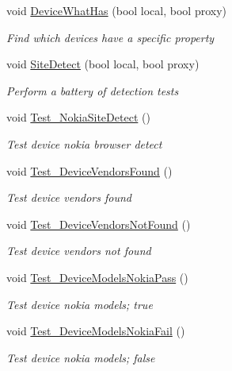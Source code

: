 \begin{DoxyCompactItemize}
void \hyperlink{class_h_d3_test_1_1_h_d3_test_af3129564580d98ec21d1ade13576ee43}{Device\+What\+Has} (bool local, bool proxy)
\begin{DoxyCompactList}\small\item\em Find which devices have a specific property \end{DoxyCompactList}\item 
void \hyperlink{class_h_d3_test_1_1_h_d3_test_a33f6daedc5c64964b38fef634f304c78}{Site\+Detect} (bool local, bool proxy)
\begin{DoxyCompactList}\small\item\em Perform a battery of detection tests \end{DoxyCompactList}\item 
void \hyperlink{class_h_d3_test_1_1_h_d3_test_aff6b193e3348e93dfe03d5369ab58d73}{Test\+\_\+\+Nokia\+Site\+Detect} ()
\begin{DoxyCompactList}\small\item\em Test device nokia browser detect \end{DoxyCompactList}\item 
void \hyperlink{class_h_d3_test_1_1_h_d3_test_a104ffe57dc36baf2057bcfb239f5f4ef}{Test\+\_\+\+Device\+Vendors\+Found} ()
\begin{DoxyCompactList}\small\item\em Test device vendors found \end{DoxyCompactList}\item 
void \hyperlink{class_h_d3_test_1_1_h_d3_test_a7577b13f23cae187e68d9d9a62692a6e}{Test\+\_\+\+Device\+Vendors\+Not\+Found} ()
\begin{DoxyCompactList}\small\item\em Test device vendors not found \end{DoxyCompactList}\item 
void \hyperlink{class_h_d3_test_1_1_h_d3_test_a691b464d492f4e04c7aaa2e3b2f96e2c}{Test\+\_\+\+Device\+Models\+Nokia\+Pass} ()
\begin{DoxyCompactList}\small\item\em Test device nokia models; true \end{DoxyCompactList}\item 
void \hyperlink{class_h_d3_test_1_1_h_d3_test_a7c2010985c6f32f98e7e9ad2b0953545}{Test\+\_\+\+Device\+Models\+Nokia\+Fail} ()
\begin{DoxyCompactList}\small\item\em Test device nokia models; false \end{DoxyCompactList}\item 

\end{DoxyCompactItemize}
